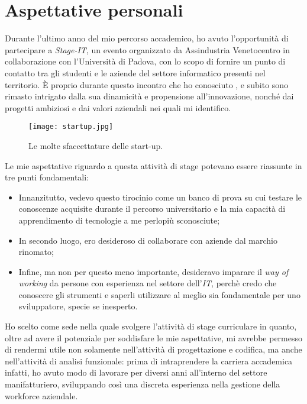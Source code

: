 \section{Aspettative personali}
Durante l'ultimo anno del mio percorso accademico, ho avuto l'opportunità di partecipare a \textit{Stage-IT}, un evento organizzato da Assindustria Venetocentro in collaborazione con l'Università di Padova, con lo scopo di fornire un punto di contatto tra gli studenti e le aziende del settore informatico presenti nel territorio.
\`E proprio durante questo incontro che ho conosciuto \AD , e subito sono rimasto intrigato dalla sua dinamicità e propensione all'innovazione, nonché dai progetti ambiziosi e dai valori aziendali nei quali mi identifico.\\
\begin{figure}[h!]
\texttt{[image: startup.jpg]}
\centering
\caption{Le molte sfaccettature delle start-up.} 
\label{fig:startup}
\end{figure}

Le mie aspettative riguardo a questa attività di stage potevano essere riassunte in tre punti fondamentali:
\begin{itemize}
\item Innanzitutto, vedevo questo tirocinio come un banco di prova su cui testare le conoscenze acquisite durante il percorso universitario e la mia capacità di apprendimento di tecnologie a me perlopiù sconosciute;
\item In secondo luogo, ero desideroso di collaborare con aziende dal marchio rinomato;
\item Infine, ma non per questo meno importante, desideravo imparare il \textit{way of working} da persone con esperienza nel settore dell'\textit{IT}, perchè credo che conoscere gli strumenti e saperli utilizzare al meglio sia fondamentale per uno sviluppatore, specie se inesperto.
\end{itemize}
Ho scelto \AD{} come sede nella quale svolgere l'attività di stage curriculare in quanto, oltre ad avere il potenziale per soddisfare le mie aspettative, mi avrebbe permesso di rendermi utile non solamente nell'attività di progettazione e codifica, ma anche nell'attività di analisi funzionale: prima di intraprendere la carriera accademica infatti, ho avuto modo di lavorare per diversi anni all'interno del settore manifatturiero, sviluppando così una discreta esperienza nella gestione della workforce aziendale.
